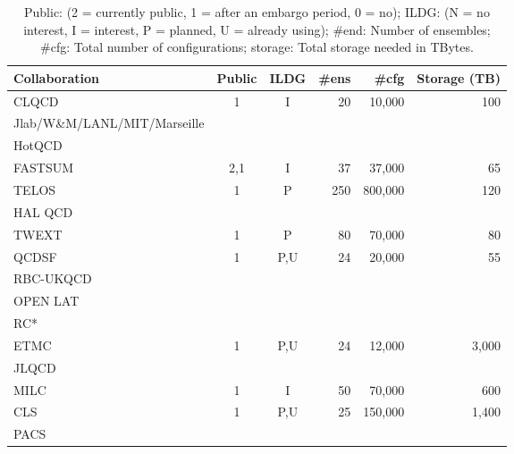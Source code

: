 \documentclass[a4paper,11pt]{article}
\begin{document}
\begin{table}[h]
  \caption{ Public: (2 = currently public, 1 = after an embargo period, 0 = no); ILDG: (N = no interest, I =
    interest, P = planned, U = already using); \#end: Number of
    ensembles; \#cfg: Total number of configurations; storage: Total
    storage needed in TBytes.
    \label{tab:summary}
  }
  \centering
  \begin{tabular}{lccrrr}\hline\hline
    Collaboration                & Public & ILDG & \#ens & \#cfg   & Storage (TB) \\\hline
    CLQCD                        & 1      & I    & 20    & 10,000  & 100          \\
    Jlab/W\&M/LANL/MIT/Marseille &        &      &       &         &              \\
    HotQCD                       &        &      &       &         &              \\
    FASTSUM                      & 2,1    & I    & 37    & 37,000  & 65           \\
    TELOS                        & 1      & P    & 250   & 800,000 & 120          \\
    HAL QCD                      &        &      &       &         &              \\
    TWEXT                        & 1      & P    & 80    & 70,000  & 80           \\
    QCDSF                        & 1      & P,U  & 24    & 20,000  & 55           \\
    RBC-UKQCD                    &        &      &       &         &              \\
    OPEN LAT                     &        &      &       &         &              \\
    RC*                          &        &      &       &         &              \\
    ETMC                         & 1      & P,U  & 24    & 12,000  & 3,000        \\
    JLQCD                        &        &      &       &         &              \\
    MILC                         & 1      & I    & 50    & 70,000  & 600          \\
    CLS                          & 1      & P,U  & 25    & 150,000 & 1,400        \\
    PACS                         &        &      &       &         &              \\\hline\hline
  \end{tabular}
\end{table}
\end{document}
